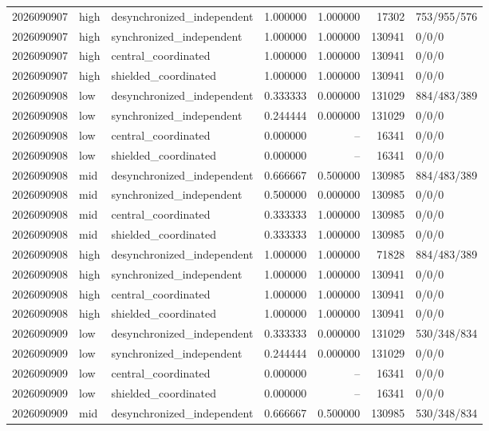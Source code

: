 \begin{longtable}{llp{38mm}rrrp{30mm}}
2026090907 & high & desynchronized\_independent & 1.000000 & 1.000000 & 17302 & 753/955/576 \\
2026090907 & high & synchronized\_independent & 1.000000 & 1.000000 & 130941 & 0/0/0 \\
2026090907 & high & central\_coordinated & 1.000000 & 1.000000 & 130941 & 0/0/0 \\
2026090907 & high & shielded\_coordinated & 1.000000 & 1.000000 & 130941 & 0/0/0 \\
2026090908 & low & desynchronized\_independent & 0.333333 & 0.000000 & 131029 & 884/483/389 \\
2026090908 & low & synchronized\_independent & 0.244444 & 0.000000 & 131029 & 0/0/0 \\
2026090908 & low & central\_coordinated & 0.000000 & -- & 16341 & 0/0/0 \\
2026090908 & low & shielded\_coordinated & 0.000000 & -- & 16341 & 0/0/0 \\
2026090908 & mid & desynchronized\_independent & 0.666667 & 0.500000 & 130985 & 884/483/389 \\
2026090908 & mid & synchronized\_independent & 0.500000 & 0.000000 & 130985 & 0/0/0 \\
2026090908 & mid & central\_coordinated & 0.333333 & 1.000000 & 130985 & 0/0/0 \\
2026090908 & mid & shielded\_coordinated & 0.333333 & 1.000000 & 130985 & 0/0/0 \\
2026090908 & high & desynchronized\_independent & 1.000000 & 1.000000 & 71828 & 884/483/389 \\
2026090908 & high & synchronized\_independent & 1.000000 & 1.000000 & 130941 & 0/0/0 \\
2026090908 & high & central\_coordinated & 1.000000 & 1.000000 & 130941 & 0/0/0 \\
2026090908 & high & shielded\_coordinated & 1.000000 & 1.000000 & 130941 & 0/0/0 \\
2026090909 & low & desynchronized\_independent & 0.333333 & 0.000000 & 131029 & 530/348/834 \\
2026090909 & low & synchronized\_independent & 0.244444 & 0.000000 & 131029 & 0/0/0 \\
2026090909 & low & central\_coordinated & 0.000000 & -- & 16341 & 0/0/0 \\
2026090909 & low & shielded\_coordinated & 0.000000 & -- & 16341 & 0/0/0 \\
2026090909 & mid & desynchronized\_independent & 0.666667 & 0.500000 & 130985 & 530/348/834 \\

\end{longtable}
